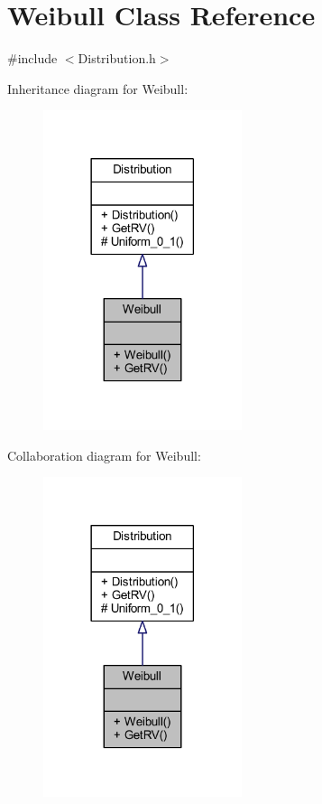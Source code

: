 \hypertarget{class_weibull}{}\section{Weibull Class Reference}
\label{class_weibull}


{\ttfamily \#include $<$Distribution.\+h$>$}



Inheritance diagram for Weibull\+:\nopagebreak
\begin{figure}[H]
\begin{center}
\leavevmode
\includegraphics[width=165pt]{class_weibull__inherit__graph}
\end{center}
\end{figure}


Collaboration diagram for Weibull\+:\nopagebreak
\begin{figure}[H]
\begin{center}
\leavevmode
\includegraphics[width=165pt]{class_weibull__coll__graph}
\end{center}
\end{figure}
